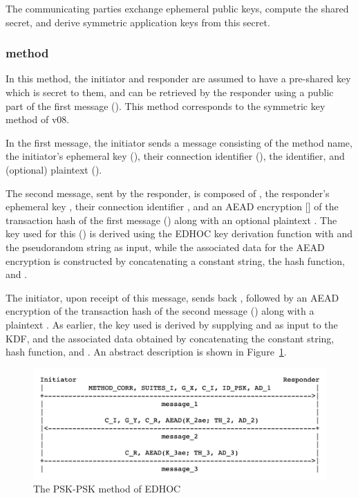 The communicating parties exchange ephemeral public keys, compute the shared secret, and derive symmetric application keys from this secret.

\subsubsection{\mPskPsk method}
In this method, the initiator and responder are assumed to have a pre-shared key which is secret to them, and can be retrieved by the responder using a public part of the first message (\mIDPSK). This method corresponds to the symmetric key method of \mEdhoc v08. 

In the first message, the initiator sends a message consisting of the method name, the initiator's ephemeral key (\mGx), their connection identifier (\mCi), the \mIDPSK identifier, and (optional) plaintext (\mADone). 

The second message, sent by the responder, is composed of \mCi, the responder's ephemeral key \mGy, their connection identifier \mCr, and an AEAD encryption [\mcneed] of the transaction hash of the first message (\mTHtwo) along with an optional plaintext \mADtwo. The key used for this (\mKtwo) is derived using the EDHOC key derivation function with \mTHtwo and the pseudorandom string \mPRKtwo as input, while the associated data for the AEAD encryption is constructed by concatenating a constant string, the hash function, and \mTHtwo. 

The initiator, upon receipt of this message, sends back \mCr, followed by an AEAD encryption of the transaction hash of the second message (\mTHthree) along with a plaintext \mADthree. As earlier, the key used is derived by supplying \mTHthree and \mPRKthree as input to the KDF, and the  associated data obtained by concatenating the constant string, hash function, and \mTHthree. An abstract description is shown in Figure~\ref{fig:edhocpsk}.


\begin{figure}\label{fig:edhocpsk}
\centering
\includegraphics[scale=0.3]{Images/psk.png}
\caption{The PSK-PSK method of EDHOC}
\end{figure}

